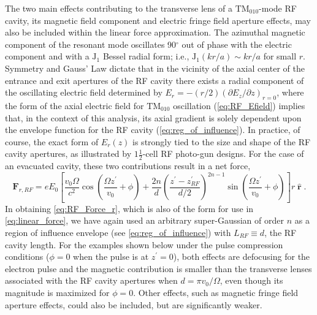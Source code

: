 The two main effects contributing to the transverse lens of a $\text{TM}_{010}$-mode RF cavity, its magnetic field component and electric fringe field aperture effects, may also be included within the linear force approximation.
The azimuthal magnetic component of the resonant mode oscillates 90$^{\circ}$ out of phase with the electric component and with a $\operatorname{ J_{1} }$ Bessel radial form; i.e., $ \operatorname{ J_{1} }( k r / a ) \sim k r / a $ for small $r$.
Symmetry and Gauss' Law dictate that in the vicinity of the axial center of the entrance and exit apertures of the RF cavity there exists a radial component of the oscillating electric field determined by $ E_{r} = -\left ( r / 2 \right ) \left ( \partial E_{z} / \partial z \right )_{r=0} $,\cite{kim_rf_1989} where the form of the axial electric field for $\text{TM}_{010}$ oscillation (\ref{eq:RF_Efield}) implies that, in the context of this analysis, its axial gradient is solely dependent upon the envelope function for the RF cavity (\ref{eq:reg_of_influence}).
In practice, of course, the exact form of $E_{r}(z)$ is strongly tied to the size and shape of the RF cavity apertures, as illustrated by $1 \frac{1}{2}$-cell RF photo-gun designs.\cite{mcdonald_design_1988}
For the case of an evacuated cavity, these two contributions result in a net force,
\begin{equation} \label{eq:RF_Force_r}
  \boldsymbol{F}_{ r , RF } = e E_{0} \left [ 
    \frac{ v_{{ \scriptscriptstyle 0}} \Omega }{c^{2}} \cos \left ( \frac{ \Omega z^{\prime} }{ v_{{ \scriptscriptstyle 0}} } + \phi \right ) + \frac{2 n}{d} \left ( \frac{z^{\prime} - z^{\prime}_{RF}}{d / 2} \right )^{2 n - 1} \sin \left ( \frac{ \Omega z^{\prime} }{ v_{{ \scriptscriptstyle 0}} } + \phi \right )
   \right ] r \hat{\operatorname{ \boldsymbol{r} }} \text{.}
\end{equation}
In obtaining \ref{eq:RF_Force_r}, which is also of the form for use in \ref{eq:linear_force}, we have again used an arbitrary super-Gaussian of order $n$ as a region of influence envelope (see \ref{eq:reg_of_influence}) with $L_{RF} \equiv d$, the RF cavity length.
For the examples shown below under the pulse compression conditions ($\phi = 0$ when the pulse is at $z^{\prime} = 0$), both effects are defocusing for the electron pulse and the magnetic contribution is smaller than the transverse lenses associated with the RF cavity apertures when $ d = \pi v_{{\scriptscriptstyle 0}} / \Omega $,\cite{kim_rf_1989} even though its magnitude is maximized for $\phi = 0$.
Other effects, such as magnetic fringe field aperture effects, could also be included, but are significantly weaker.

